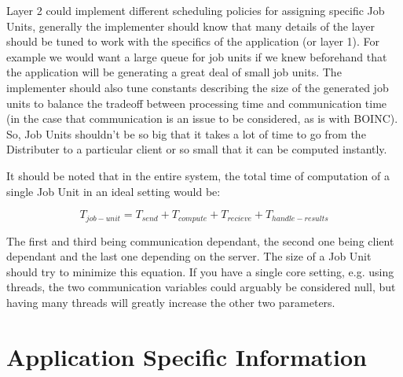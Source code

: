 \documentclass[a4paper]{article}
\begin{document}
Layer 2 could implement different scheduling policies for assigning specific Job Units, generally the implementer should know that many details of the layer should be tuned to work with the specifics of the application (or layer 1). For example we would want a large queue for job units if we knew beforehand that the application will be generating a great deal of small job units. The implementer should also tune constants describing the size of the generated job units to balance the tradeoff between processing time and communication time (in the case that communication is an issue to be considered, as is with BOINC). So, Job Units shouldn't be so big that it takes a lot of time to go from the Distributer to a particular client or so small that it can be computed instantly. 

It should be noted that in the entire system, the total time of computation of a single Job Unit in an ideal setting would be:

$$T_{job-unit} = T_{send} + T_{compute} + T_{recieve} + T_{handle-results}$$

The first and third being communication dependant,  the second one being client dependant and the last one depending on the server. The size of a Job Unit should try to minimize this equation. If you have a single core setting, e.g. using threads, the two communication variables could arguably be considered null, but having many threads will greatly increase the other two parameters.

\section{Application Specific Information}
\end{document}
